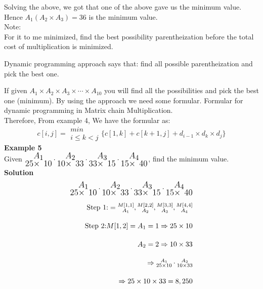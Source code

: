 \documentclass[12pt]{report}
\begin{document}
	Solving the above, we got that one of the above gave us the minimum value.\\
	Hence $A_1(A_2 \times A_3) = 36$ is the minimum value.\\
	Note:\\
	For it to me minimized, find the best possibility parentheization before the total cost of multiplication is minimized.
	
	Dynamic programming approach says that: find all possible parentheization and pick the best one.
	
	If given $A_1 \times A_2\times A_3\times \cdots \times A_{10}$ you will find all the possibilities and pick the best one (minimum). By using the approach we need some formular. Formular for dynamic programming in Matrix chain Multiplication.\\
	Therefore,
	From example 4,
	We have the formular as:
	$$c[i,j] = \substack{min\\{i\le k < j}}\bigg\{ c[1,k] + c[k+1,j] + d_{i-1} \times d_k\times d_j\bigg\}$$
	\textbf{Example 5}\\
	Given $\LARGE\substack{A_1\\{25 \times ~10}}\cdot \substack{A_2\\ {10\times ~33}} \cdot \substack{A_3\\ {33 \times~15}}\cdot\substack{A_4\\ {15\times ~40}}$, find the minimum value.\\
	\textbf{Solution}
	\begin{align*}
		\LARGE\substack{A_1\\{25 \times ~10}}\cdot \substack{A_2\\ {10\times ~33}} \cdot \substack{A_3\\ {33 \times~15}}\cdot\substack{A_4\\ {15\times ~40}}\\
		\text{Step 1:}=  \substack{M[1,1]\\A_1},\substack{M[2,2]\\A_2}, \substack{M[3,3]\\A_3}, \substack{M[4,4]\\A_4}\\
		\text{Step 2:}
		M[1,2]=  A_1 = 1 \Rightarrow 25 \times 10\\
		A_2 = 2 \Rightarrow 10 \times 33\\
		\Rightarrow \substack{A_1\\25\times 10} \cdot \substack{A_2\\10\times 33}\\
		\Rightarrow 25 \times 10 \times 33 = 8,250
	\end{align*}
\end{document}
